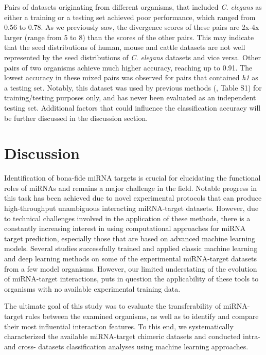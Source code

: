 \documentclass{bmcart}
\begin{document}
Pairs of datasets originating from different organisms, that included \textit{C. elegans} as either a training or a testing set achieved poor performance, which ranged from 0.56 to 0.78. As we previously saw, the divergence scores of these pairs are 2x-4x larger (range from 5 to 8) than the scores of the other pairs. This may indicate that the seed distributions of human, mouse and cattle datasets are not well represented by the seed distributions of \textit{C. elegans} datasets and vice versa. Other pairs of two organisms achieve much higher accuracy, reaching up to 0.91. The lowest accuracy in these mixed pairs was observed for pairs that contained \textit{h1} as a testing set. Notably, this dataset was used by previous methods (, Table S1) for training/testing purposes only, and has never been evaluated as an independent testing set.   Additional factors that could influence the classification accuracy will be further discussed in the discussion section.

\clearpage
\section*{Discussion}
Identification of bona-fide miRNA targets is crucial for elucidating the functional roles of miRNAs and remains a major challenge in the field. Notable progress in this task has been achieved due to novel experimental protocols that can produce high-throughput unambiguous interacting miRNA-target datasets. However, due to technical challenges involved in the application of these methods, there is a constantly increasing interest in using computational approaches for miRNA target prediction, especially those that are based on advanced machine learning models. Several studies successfully trained and applied classic machine learning \cite{lu2016learning, ding2016tarpmir, wang2016improving, liu2019prediction} and deep learning \cite{wen2018deepmirtar, paker2019mirlstm, pla2018miraw} methods on some of the experimental miRNA-target datasets from a few model organisms. However, our limited understating of the evolution of miRNA-target interactions, puts in question the applicability of these tools to organisms with no available experimental training data.

The ultimate goal of this study was to evaluate the transferability of miRNA-target rules between the examined organisms, as well as to identify and compare their most influential interaction features. To this end, we systematically characterized the available miRNA-target chimeric datasets and conducted intra- and cross- datasets classification analyses using machine learning approaches.  
\end{document}
